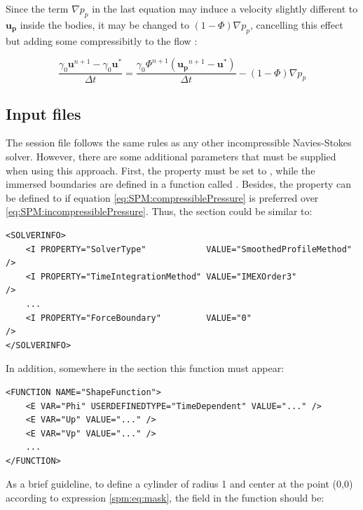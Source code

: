 Since the term $\nabla p_p$ in the last equation may induce a velocity slightly
different to $\mathbf{u_p}$ inside the bodies, it may be changed to
$(1-\Phi)\nabla p_p$, cancelling this effect but adding some compressibitly to
the flow \cite{LuoSPM}:

\begin{equation} \label{eq:SPM:compressiblePressure}
    \frac{\gamma_0\mathbf{u}^{n+1}-\gamma_0\mathbf{u^*}}{\Delta t} =
        \frac{\gamma_0\Phi^{n+1}(\mathbf{u_p}^{n+1}-\mathbf{u^*})}{\Delta t} -
        (1-\Phi) \nabla p_p
\end{equation}

\subsection{Input files}

The session file follows the same rules as any other incompressible
Navies-Stokes solver. However, there are some additional parameters that must
be supplied when using this approach. First, the property 
must be set to , while the immersed boundaries are
defined in a function called . Besides, the property
 can be defined to  if equation
\eqref{eq:SPM:compressiblePressure} is preferred over
\eqref{eq:SPM:incompressiblePressure}. Thus, the  section
could be similar to:

\begin{lstlisting}[style=XMLStyle]
<SOLVERINFO>
    <I PROPERTY="SolverType"            VALUE="SmoothedProfileMethod" />
    <I PROPERTY="TimeIntegrationMethod" VALUE="IMEXOrder3"            />
    ...
    <I PROPERTY="ForceBoundary"         VALUE="0"                     />
</SOLVERINFO>
\end{lstlisting}

In addition, somewhere in the  section this function must
appear:

\begin{lstlisting}[style=XMLStyle]
<FUNCTION NAME="ShapeFunction">
    <E VAR="Phi" USERDEFINEDTYPE="TimeDependent" VALUE="..." />
    <E VAR="Up" VALUE="..." />
    <E VAR="Vp" VALUE="..." />
    ...
</FUNCTION>
\end{lstlisting}

As a brief guideline, to define a cylinder of radius 1 and center at the point
(0,0) according to expression \eqref{spm:eq:mask}, the  field in
the  function should be:

